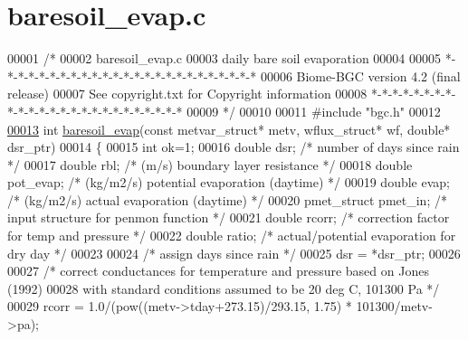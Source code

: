 \hypertarget{baresoil__evap_8c_source}{}\section{baresoil\+\_\+evap.\+c}
\label{baresoil__evap_8c_source}

\begin{DoxyCode}
00001 \textcolor{comment}{/* }
00002 \textcolor{comment}{baresoil\_evap.c}
00003 \textcolor{comment}{daily bare soil evaporation}
00004 \textcolor{comment}{}
00005 \textcolor{comment}{*-*-*-*-*-*-*-*-*-*-*-*-*-*-*-*-*-*-*-*-*-*-*-*-*}
00006 \textcolor{comment}{Biome-BGC version 4.2 (final release)}
00007 \textcolor{comment}{See copyright.txt for Copyright information}
00008 \textcolor{comment}{*-*-*-*-*-*-*-*-*-*-*-*-*-*-*-*-*-*-*-*-*-*-*-*-*}
00009 \textcolor{comment}{*/}
00010 
00011 \textcolor{preprocessor}{#include "bgc.h"}
00012 
\hypertarget{baresoil__evap_8c_source_l00013}{}\hyperlink{baresoil__evap_8c_a9fcd7d8f180b7c75bebbd7f3c544218e}{00013} \textcolor{keywordtype}{int} \hyperlink{baresoil__evap_8c_a9fcd7d8f180b7c75bebbd7f3c544218e}{baresoil\_evap}(\textcolor{keyword}{const} metvar\_struct* metv, wflux\_struct* wf, \textcolor{keywordtype}{double}* dsr\_ptr)
00014 \{
00015     \textcolor{keywordtype}{int} ok=1;
00016     \textcolor{keywordtype}{double} dsr;              \textcolor{comment}{/* number of days since rain */}
00017     \textcolor{keywordtype}{double} rbl;              \textcolor{comment}{/* (m/s) boundary layer resistance */}
00018     \textcolor{keywordtype}{double} pot\_evap;         \textcolor{comment}{/* (kg/m2/s) potential evaporation (daytime) */}
00019     \textcolor{keywordtype}{double} evap;             \textcolor{comment}{/* (kg/m2/s) actual evaporation (daytime) */}
00020     pmet\_struct pmet\_in;     \textcolor{comment}{/* input structure for penmon function */}
00021     \textcolor{keywordtype}{double} rcorr;            \textcolor{comment}{/* correction factor for temp and pressure */}
00022     \textcolor{keywordtype}{double} ratio;            \textcolor{comment}{/* actual/potential evaporation for dry day */}
00023 
00024     \textcolor{comment}{/* assign days since rain */}
00025     dsr = *dsr\_ptr;
00026     
00027     \textcolor{comment}{/* correct conductances for temperature and pressure based on Jones (1992)}
00028 \textcolor{comment}{    with standard conditions assumed to be 20 deg C, 101300 Pa */}
00029     rcorr = 1.0/(pow((metv->tday+273.15)/293.15, 1.75) * 101300/metv->pa);

\end{DoxyCode}
